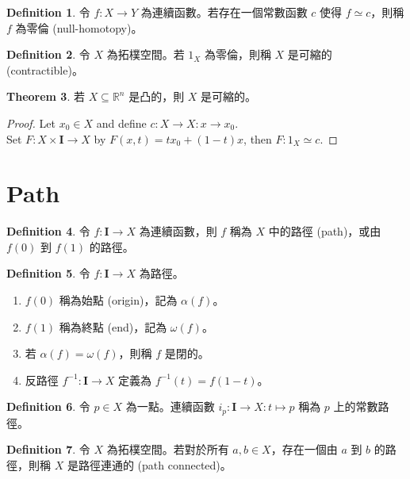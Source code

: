 \documentclass[12pt]{article}
\theoremstyle{definition}
\newtheorem{definition}{Definition}[section]
\newtheorem{theorem}[definition]{Theorem}
\newcommand\<{\langle}
\renewcommand\>{\rangle}
\begin{document}
\begin{CJK}{UTF8}{bsmi}
\begin{definition}
    令 $f:X\to Y$ 為連續函數。若存在一個常數函數 $c$ 使得 $f\simeq c$，則稱 $f$ 為零倫 (null-homotopy)。
\end{definition}

\begin{definition}
    令 $X$ 為拓樸空間。若 $1_X$ 為零倫，則稱 $X$ 是可縮的 (contractible)。
\end{definition}

\begin{theorem}
    若 $X\subseteq\mathbb{R}^n$ 是凸的，則 $X$ 是可縮的。
\end{theorem}
\begin{proof}
    Let $x_0\in X$ and define $c:X\to X:x\to x_0$. \\
    Set $F:X\times\textbf{I}\to X$ by $F(x, t)=tx_0+(1-t)x$, then $F:1_X\simeq c$.
\end{proof}

\section{Path}

\begin{definition}
    令 $f:\textbf{I}\to X$ 為連續函數，則 $f$ 稱為 $X$ 中的路徑 (path)，或由 $f(0)$ 到 $f(1)$ 的路徑。
\end{definition}

\begin{definition}
    令 $f:\textbf{I}\to X$ 為路徑。
    \begin{enumerate}
        \item $f(0)$ 稱為始點 (origin)，記為 $\alpha(f)$。
        \item $f(1)$ 稱為終點 (end)，記為 $\omega(f)$。
        \item 若 $\alpha(f)=\omega(f)$，則稱 $f$ 是閉的。
        \item 反路徑 $f^{-1}:\textbf{I}\to X$ 定義為 $f^{-1}(t)=f(1-t)$。
    \end{enumerate}
\end{definition}

\begin{definition}
    令 $p\in X$ 為一點。連續函數 $i_p:\textbf{I}\to X:t\mapsto p$ 稱為 $p$ 上的常數路徑。
\end{definition}

\begin{definition}
    令 $X$ 為拓樸空間。若對於所有 $a, b\in X$，存在一個由 $a$ 到 $b$ 的路徑，則稱 $X$ 是路徑連通的 (path connected)。
\end{definition}


\end{CJK}
\end{document}
